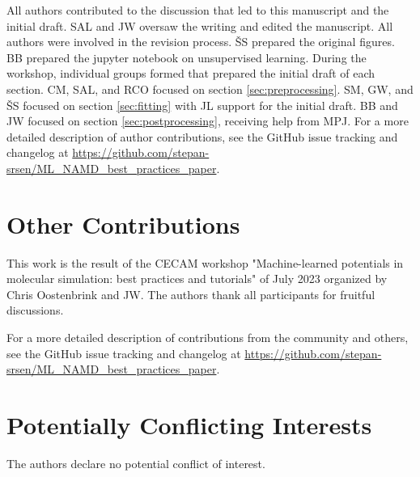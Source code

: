 \documentclass[9pt,bestpractices]{livecoms}
\newcommand{\githubrepository}{\url{https://github.com/stepan-srsen/ML_NAMD_best_practices_paper}}  %
\begin{document}
All authors contributed to the discussion that led to this manuscript and the initial draft. 
SAL and JW oversaw the writing and edited the manuscript. All authors were involved in the revision process. ŠS prepared the original figures. BB prepared the jupyter notebook on unsupervised learning. During the workshop, individual groups formed that prepared the initial draft of each section. CM, SAL, and RCO focused on section \ref{sec:preprocessing}. SM, GW, and ŠS focused on section \ref{sec:fitting} with JL support for the initial draft. BB and JW focused on section \ref{sec:postprocessing}, receiving help from MPJ. 
For a more detailed description of author contributions,
see the GitHub issue tracking and changelog at \githubrepository.

\section*{Other Contributions}
%

This work is the result of the CECAM workshop "Machine-learned potentials in molecular simulation: best practices and tutorials" of July 2023 organized by Chris Oostenbrink and JW. 
The authors thank all participants for fruitful discussions. 

For a more detailed description of contributions from the community and others, see the GitHub issue tracking and changelog at \githubrepository.

\section*{Potentially Conflicting Interests}

The authors declare no potential conflict of interest.
\end{document}

